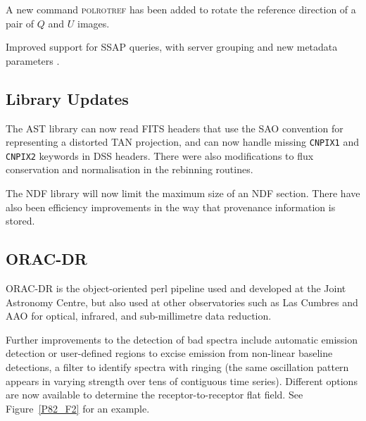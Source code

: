 \documentclass[11pt,twoside]{article}
\begin{document}



A new command \textsc{polrotref} has been added to rotate the
reference direction of a pair of $Q$ and $U$ images.


Improved support for SSAP queries, with server grouping and new metadata
parameters \citep[see][for a protocol introduction]{2004SPIE.5493..262D}.


\subsection*{Library Updates}


The AST library \citep[see][and references
therein]{2012ASPC..461..825B} can now read FITS headers that use the
SAO convention for representing a distorted TAN projection, and can
now handle missing \texttt{CNPIX1} and \texttt{CNPIX2} keywords in DSS
headers. There were also modifications to flux conservation and
normalisation in the rebinning routines.


The NDF library will now limit the maximum size of an NDF
section. There have also been efficiency improvements in the way that
provenance information is stored.

\subsection*{ORAC-DR}

ORAC-DR \citep{Cavanagh2008} is the object-oriented perl pipeline used
and developed at the Joint Astronomy Centre, but also used at other
observatories such as Las Cumbres and AAO for optical, infrared, and
sub-millimetre data reduction.


Further improvements to the detection of bad spectra
\citep{P61_adassxxii} include automatic emission detection or
user-defined regions to excise emission from non-linear baseline
detections, a filter to identify spectra with ringing (the same
oscillation pattern appears in varying strength over tens of
contiguous time series).  Different options are now available to
determine the receptor-to-receptor flat field.  See
Figure~\ref{P82_F2} for an example.
\end{document}
